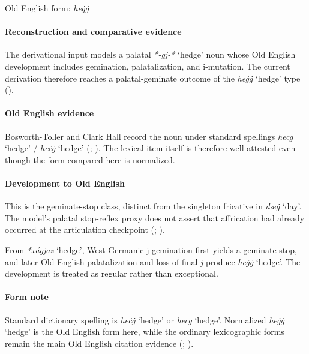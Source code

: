 \documentclass[
  british,
  a4paper,
]{article}
\providecommand{\Recon}[1]{\emph{*#1}}
\begin{document}
Old English form: \emph{heġġ}

\paragraph{Reconstruction and comparative
evidence}\label{reconstruction-and-comparative-evidence-30}

The derivational input models a palatal \Recon{-gj-*} `hedge' noun whose
Old English development includes gemination, palatalization, and
i-mutation. The current derivation therefore reaches a palatal-geminate
outcome of the \emph{heġġ} `hedge' type
().

\paragraph{Old English evidence}\label{old-english-evidence-30}

Bosworth-Toller and Clark Hall record the noun under standard spellings
\emph{hecg} `hedge' / \emph{heċġ} `hedge'
(;
). The lexical item itself
is therefore well attested even though the form compared here is
normalized.

\paragraph{Development to Old
English}\label{development-to-old-english-30}

This is the geminate-stop class, distinct from the singleton fricative
in \emph{dæġ} `day'. The model's palatal stop-reflex proxy does not
assert that affrication had already occurred at the articulation
checkpoint (; ).

From \Recon{xágjaz} `hedge', West Germanic j-gemination first yields a
geminate stop, and later Old English palatalization and loss of final
\emph{j} produce \emph{heġġ} `hedge'. The development is treated as
regular rather than exceptional.

\paragraph{Form note}\label{form-note-6}

Standard dictionary spelling is \emph{heċġ} `hedge' or \emph{hecg}
`hedge'. Normalized \emph{heġġ} `hedge' is the Old English form here,
while the ordinary lexicographic forms remain the main Old English
citation evidence (; ).
\end{document}
